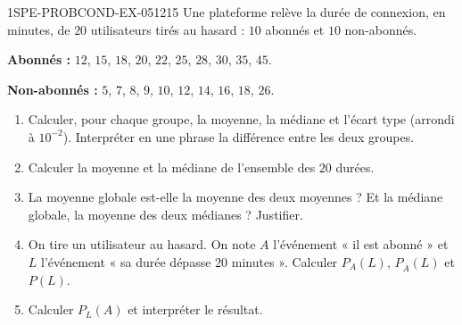 \begin{exercice}{1SPE-PROBCOND-EX-051}{2}{15}
Une plateforme relève la durée de connexion, en minutes, de $20$ utilisateurs
tirés au hasard : $10$ abonnés et $10$ non-abonnés.

\medskip
\textbf{Abonnés :} $12$, $15$, $18$, $20$, $22$, $25$, $28$, $30$, $35$, $45$.

\textbf{Non-abonnés :} $5$, $7$, $8$, $9$, $10$, $12$, $14$, $16$, $18$, $26$.

\begin{enumerate}
\item Calculer, pour chaque groupe, la moyenne, la médiane et l'écart type
  (arrondi à $10^{-2}$). Interpréter en une phrase la différence entre les
  deux groupes.
\item Calculer la moyenne et la médiane de l'ensemble des $20$ durées.
\item La moyenne globale est-elle la moyenne des deux moyennes ? Et la
  médiane globale, la moyenne des deux médianes ? Justifier.
\item On tire un utilisateur au hasard. On note $A$ l'événement « il est
  abonné » et $L$ l'événement « sa durée dépasse $20$ minutes ».
  Calculer $P_A(L)$, $P_{\overline{A}}(L)$ et $P(L)$.
\item Calculer $P_L(A)$ et interpréter le résultat.
\end{enumerate}
\end{exercice}
